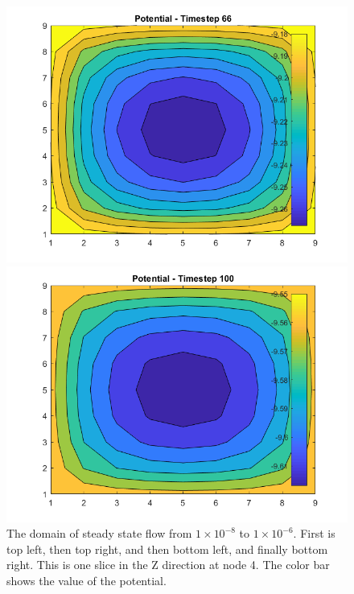 \begin{figure}
\begin{minipage}[b]{0.45\textwidth}
    \includegraphics[width=\linewidth]{figures/potential_66.png}
  \end{minipage} %
  \begin{minipage}[b]{0.45\textwidth}
    \centering
    \includegraphics[width=\linewidth]{figures/potential_100.png}
  \end{minipage}
  \caption[Steady State Potential]{The domain of steady state flow from \(1\times10^{-8}\) to \(1\times10^{-6}\). First is top left, then top right, and then bottom left, and finally bottom right. This is one slice in the Z direction at node 4. The color bar shows the value of the potential.}
  \label{fig:steadypot}
\end{figure}


